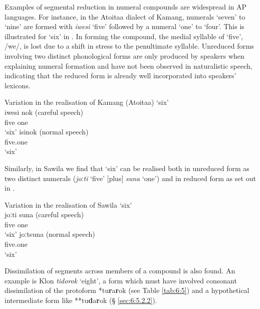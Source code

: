 Examples of segmental reduction in numeral compounds are widespread in AP languages. For instance, in the Atoitaa dialect of Kamang, numerals `seven' to `nine' are formed with \textit{iwesi}\textit{{\ng}} `five' followed by a numeral `one' to `four'. This is illustrated for `six' in . In forming the compound, the medial syllable of `five', /we/, is lost due to a shift in stress to the penultimate syllable. Unreduced forms involving two distinct phonological forms are only produced by speakers when explaining numeral formation and have not been observed in naturalistic speech, indicating that the reduced form is already well incorporated into speakers' lexicons.


 
\ea%
\label{ex:6:1}
\upshape
  Variation in the realisation of Kamang (Atoitaa) `six'\\
\ea
\gll iwesi{\ng} nok {    (careful speech)}\\
      five    one    \\
\glt `six'
\ex
\gll isi{\ng}nok        {    (normal speech)}\\
     five.one  \\
\glt`six'
\z
\z 

 
    

Similarly, in Sawila we find that `six' can be realised both in unreduced form as two distinct numerals (\textit{joːti}\textit{{\ng}} `five' [plus] \textit{suna} `one') and in reduced form as set out in .  

 
\ea%
\label{ex:6:2}
\upshape
Variation in the realisation of Sawila `six'\\
\ea
\gll joːti{\ng} suna       {\upshape    (careful speech)}\\
    five    one     \\
\glt`six'
\ex
\gll joːtsuna          {\upshape   (normal speech)}\\
      five.one  \\
\glt   `six'
\z
\z 
 

Dissimilation of segments across members of a compound is also found. An example is Klon \textit{tidorok} `eight', a form which must have involved consonant dissimilation of the protoform *tu\textbf{r}a\textbf{r}ok (see Table \ref{tab:6:5}) and a hypothetical intermediate form like **tu\textbf{d}a\textbf{r}ok ({\S} \ref{sec:6:5.2.2}).

